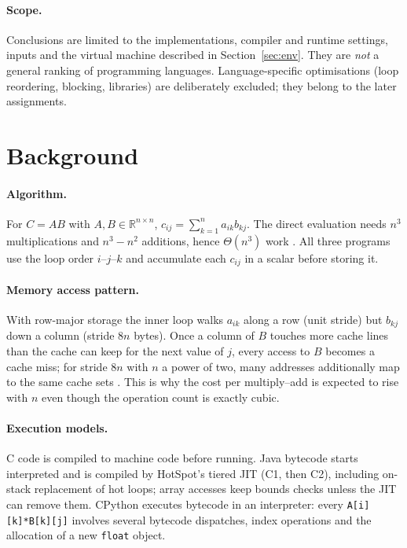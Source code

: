 \paragraph{Scope.} Conclusions are limited to the implementations, compiler and runtime settings, inputs and the
virtual machine described in Section~\ref{sec:env}. They are \emph{not} a general ranking of programming languages.
Language-specific optimisations (loop reordering, blocking, libraries) are deliberately excluded; they belong to
the later assignments.

\section{Background}

\paragraph{Algorithm.} For $C = AB$ with $A,B\in\mathbb{R}^{n\times n}$, $c_{ij}=\sum_{k=1}^{n}a_{ik}b_{kj}$. The
direct evaluation needs $n^3$ multiplications and $n^3-n^2$ additions, hence $\Theta(n^3)$ work \cite{clrs}. All
three programs use the loop order $i$--$j$--$k$ and accumulate each $c_{ij}$ in a scalar before storing it.

\paragraph{Memory access pattern.} With row-major storage the inner loop walks $a_{ik}$ along a row (unit stride) but
$b_{kj}$ down a column (stride $8n$ bytes). Once a column of $B$ touches more cache lines than the cache can
keep for the next value of $j$, every access to $B$ becomes a cache miss; for stride $8n$ with $n$ a power of two,
many addresses additionally map to the same cache sets \cite{drepper,hennessy}. This is why the cost per
multiply--add is expected to rise with $n$ even though the operation count is exactly cubic.

\paragraph{Execution models.} C code is compiled to machine code before running. Java bytecode starts interpreted
and is compiled by HotSpot's tiered JIT (C1, then C2), including on-stack replacement of hot loops; array accesses
keep bounds checks unless the JIT can remove them. CPython executes bytecode in an interpreter: every
\texttt{A[i][k]*B[k][j]} involves several bytecode dispatches, index operations and the allocation of a new
\texttt{float} object.

